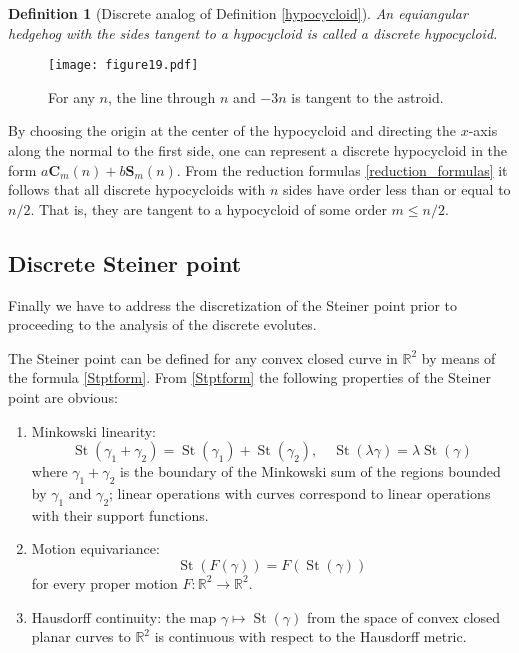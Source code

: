 \documentclass[12pt]{article}
\newtheorem{definition}[lemma]{Definition}
\newcommand{\R}{\mathbb {R}}
\newcommand{\St}{\operatorname{St}}
\begin{document}
\begin{definition}[Discrete analog of Definition \ref{hypocycloid}]\label{discrete_hypocycloids} An equiangular hedgehog with the sides tangent to a hypocycloid is called a \emph{discrete hypocycloid}. 
\end{definition}

\begin{figure} [htbp]
\centering
\texttt{[image: figure19.pdf]}
\caption{For any $n$, the line through $n$ and $-3n$ is tangent to the astroid.}
\label{AstroidCremona}
\end{figure}

By choosing the origin at the center of the hypocycloid and directing the $x$-axis along the normal to the first side, one can represent a discrete hypocycloid in the form $a\mathbf{C}_m(n) + b\mathbf{S}_m(n)$. From the reduction formulas \eqref{reduction_formulas} it follows that all discrete hypocycloids with $n$ sides have order less than or equal to $n/2$. That is, they are tangent to a hypocycloid of some order $m\le n/2$.

\subsection{Discrete Steiner point}\label{DiscrSteiner}

Finally we have to address the discretization of the Steiner point prior to proceeding to the analysis of the discrete evolutes. 

The Steiner point can be defined for any convex closed curve in $\R^2$ by means of the formula \eqref{Stptform}.
From \eqref{Stptform} the following properties of the Steiner point are obvious:
\begin{enumerate}
\item
Minkowski linearity:
\[
\St(\gamma_1 + \gamma_2) = \St(\gamma_1) + \St(\gamma_2), \quad \St(\lambda\gamma) = \lambda\St(\gamma)
\]
where $\gamma_1 + \gamma_2$ is the boundary of the Minkowski sum of the regions bounded by $\gamma_1$ and $\gamma_2$; linear operations with curves correspond to linear operations with their support functions.
\item
Motion equivariance:
\[
\St(F(\gamma)) = F(\St(\gamma))
\]
for every proper motion $F \colon \R^2 \to \R^2$.
\item
Hausdorff continuity: the map $\gamma \mapsto \St(\gamma)$ from the space of convex closed planar curves to $\R^2$ is continuous with respect to the Hausdorff metric.
\end{enumerate}
\end{document}
